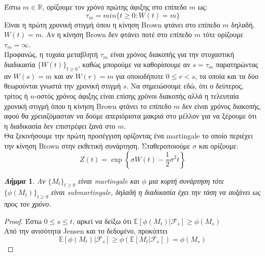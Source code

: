 \documentclass[12pt,a4paper,twoside,openany]{book}
\newtheorem{lemma}[theorem]{\textit{Λήμμα}}
\begin{document}
		
	\vspace{2.5mm}
		\noindent Έστω $m\in\mathbb{R}$, ορίζουμε τον χρόνο πρώτης άφιξης στο επίπεδο $m$ ως: \[\tau_m=min\{t\geq0:W(t)=m\}\]	
		Είναι η πρώτη χρονική στιγμή όπου η κίνηση Brown φτάνει στο επίπεδο $m$ δηλαδή, $W(t)=m$. Αν η κίνηση Brown δεν φτάνει ποτέ στο επίπεδο $m$ τότε ορίζουμε $\tau_m=\infty$.
	\vspace{2.5mm}\\
		Προφανώς, η τυχαία μεταβλητή $\tau_m$ είναι χρόνος διακοπής για την στοχαστική διαδικασία $\{W(t)\}_{t\geq0}$, καθώς μπορούμε να καθορίσουμε αν $s=\tau_m$ παρατηρώντας αν $W(s)=m$ και αν $W(r)=m$ για οποιοδήποτε $0\leq r<s$, τα οποία και τα δύο θεωρούνται γνωστά την χρονική στιγμή $s$. Να σημειώσουμε εδώ, ότι ο δεύτερος, τρίτος ή $n$-οστός χρόνος άφιξης είναι επίσης χρόνοι διακοπής αλλά η τελευταία χρονική στιγμή όπου η κίνηση Brown φτάνει το επίπεδο $m$ δεν είναι χρόνος διακοπής, αφού θα χρειαζόμασταν να δούμε απεριόριστα μακριά στο μέλλον για να ξέρουμε ότι η διαδικασία δεν επιστρέφει ξανά στο $m$.
	\vspace{2.5mm}\\
		Θα ξεκινήσουμε την πρώτη προσέγγιση ορίζοντας ένα martingale το οποίο περιέχει την κίνηση Brown στην εκθετική συνάρτηση. Σταθεροποιούμε $\sigma$ και ορίζουμε: \[Z(t)= \exp\left\{\sigma W(t)-\frac{1}{2}\sigma^2t\right\}\]
		\begin{lemma}
			Αν $\{M_ t\}_{t\geq0}$ είναι martingale και $\phi$ μια κυρτή συνάρτηση τότε $\{\phi(M_ t)\}_{t\geq0}$ είναι submartingale, δηλαδή η διαδικασία έχει την τάση να αυξάνει ως προς τον χρόνο.
		\end{lemma}
		\begin{proof}
			Έστω $0\leq s\leq t$, αρκεί να δείξω ότι $\mathbb{E}[\phi(M_t)|\mathcal{F}_s]\geq\phi(M_s)$ \\Από την ανισότητα Jensen και το δεδομένο, προκύπτει\\
			\[\mathbb{E}[\phi(M_t)|\mathcal{F}_s]\geq\phi(\mathbb{E}[M_t|\mathcal{F}_s])=\phi(M_s)\]
		\end{proof}
\end{document}
